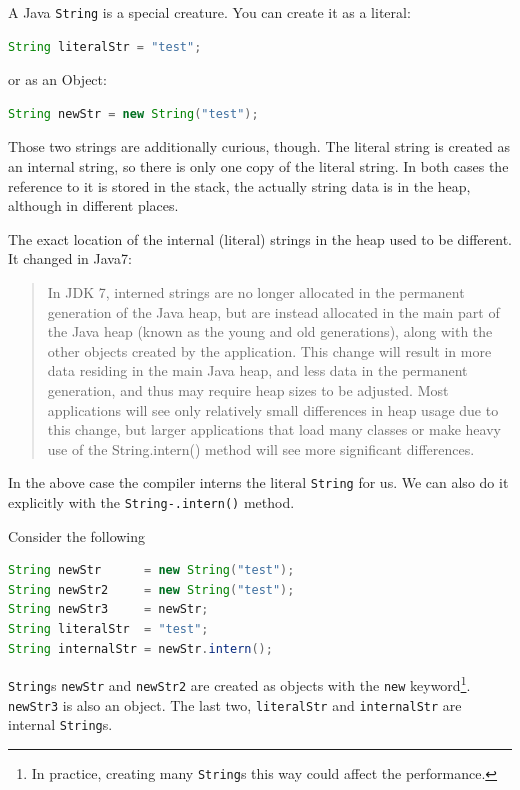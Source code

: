 A Java \texttt{String} is a special creature. You can create it as a literal:
\begin{lstlisting}[language=Java]
String literalStr = "test";
\end{lstlisting}
or as an Object:
\begin{lstlisting}[language=Java]
String newStr = new String("test");
\end{lstlisting}


Those two strings are additionally curious, though. The literal string is created as an internal string, so there is only one copy of the literal string. In both cases the reference to it is stored in the stack, the actually string data is in the heap, although in different places.

The exact location of the internal (literal) strings in the heap used to be different. It changed in Java7\cite{java7}:

\begin{quotation}
In JDK 7, interned strings are no longer allocated in the permanent generation of the Java heap, but are instead allocated in the main part of the Java heap (known as the young and old generations), along with the other objects created by the application. This change will result in more data residing in the main Java heap, and less data in the permanent generation, and thus may require heap sizes to be adjusted. Most applications will see only relatively small differences in heap usage due to this change, but larger applications that load many classes or make heavy use of the String.intern() method will see more significant differences.
\end{quotation}

In the above case the compiler interns the literal \texttt{String} for us. We can also do it explicitly with the \texttt{String\hyp{}.intern()} method.

Consider the following
\begin{lstlisting}[language=Java]
String newStr      = new String("test");
String newStr2     = new String("test");
String newStr3     = newStr;
String literalStr  = "test";
String internalStr = newStr.intern();
\end{lstlisting}

\texttt{String}s \texttt{newStr} and \texttt{newStr2} are created as objects with the \texttt{new} keyword\footnote{In practice, creating many \texttt{String}s this way could affect the performance.}. \texttt{newStr3} is also an object. The last two, \texttt{literalStr} and \texttt{internalStr} are internal \texttt{String}s.

